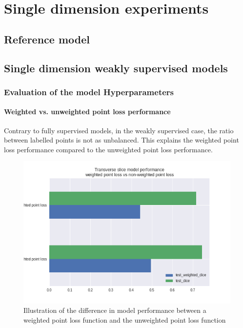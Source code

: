 \chapter{Single dimension experiments}


\section{Reference model}

\section{Single dimension weakly supervised models}

\subsection{Evaluation of the model Hyperparameters}

\subsubsection{Weighted vs. unweighted point loss performance}

Contrary to fully supervised models, in the weakly supervised case, the ratio between labelled points is not as unbalanced.
This explains the weighted point loss performance compared to the unweighted point loss performance.

\begin{figure}
    \centering
    \includegraphics[width=.95\textwidth]{images/TransverseModel_weightedvsnonweighted.png}
    \caption{Illustration of the difference in model performance between a weighted point loss function and the unweighted point loss function}
\end{figure}

